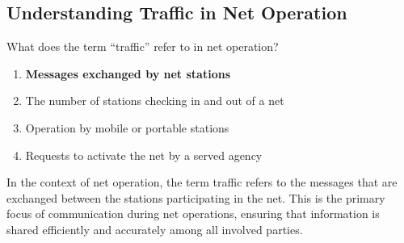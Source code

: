 \subsection{Understanding Traffic in Net Operation}
\label{T2C05}

\begin{tcolorbox}[colback=gray!10!white,colframe=black!75!black,title=T2C05]
What does the term “traffic” refer to in net operation?
\begin{enumerate}[noitemsep]
    \item \textbf{Messages exchanged by net stations}
    \item The number of stations checking in and out of a net
    \item Operation by mobile or portable stations
    \item Requests to activate the net by a served agency
\end{enumerate}
\end{tcolorbox}

In the context of net operation, the term traffic refers to the messages that are exchanged between the stations participating in the net. This is the primary focus of communication during net operations, ensuring that information is shared efficiently and accurately among all involved parties.